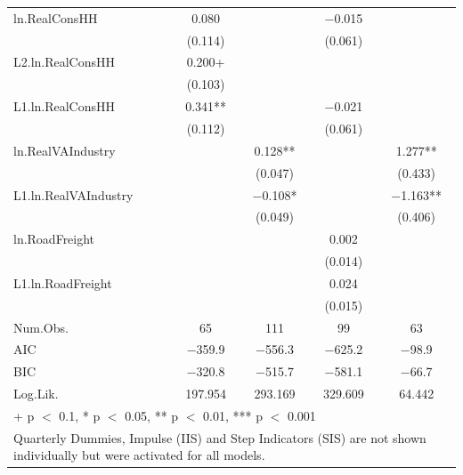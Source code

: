 \begin{table}
{\begin{tabular}[t]{lcccc}
ln.RealConsHH & \num{0.080} &  & \num{-0.015} & \\
 & (\num{0.114}) &  & (\num{0.061}) & \\
L2.ln.RealConsHH & \num{0.200}+ &  &  & \\
 & (\num{0.103}) &  &  & \\
L1.ln.RealConsHH & \num{0.341}** &  & \num{-0.021} & \\
 & (\num{0.112}) &  & (\num{0.061}) & \\
ln.RealVAIndustry &  & \num{0.128}** &  & \num{1.277}**\\
 &  & (\num{0.047}) &  & (\num{0.433})\\
L1.ln.RealVAIndustry &  & \num{-0.108}* &  & \num{-1.163}**\\
 &  & (\num{0.049}) &  & (\num{0.406})\\
ln.RoadFreight &  &  & \num{0.002} & \\
 &  &  & (\num{0.014}) & \\
L1.ln.RoadFreight &  &  & \num{0.024} & \\
 &  &  & (\num{0.015}) & \\
\midrule
Num.Obs. & \num{65} & \num{111} & \num{99} & \num{63}\\
AIC & \num{-359.9} & \num{-556.3} & \num{-625.2} & \num{-98.9}\\
BIC & \num{-320.8} & \num{-515.7} & \num{-581.1} & \num{-66.7}\\
Log.Lik. & \num{197.954} & \num{293.169} & \num{329.609} & \num{64.442}\\
\bottomrule
\multicolumn{5}{l}{\rule{0pt}{1em}+ p $<$ 0.1, * p $<$ 0.05, ** p $<$ 0.01, *** p $<$ 0.001}\\
\multicolumn{5}{l}{\rule{0pt}{1em}Quarterly Dummies, Impulse (IIS) and Step Indicators (SIS) are not shown individually but were activated for all models.}\\
\end{tabular}}
\end{table}
